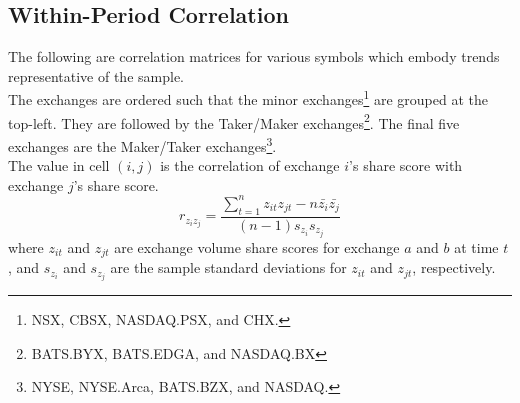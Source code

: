 \documentclass{article}
\begin{document}
\subsection{Within-Period Correlation} \label{withinperiodcorr}
The following are correlation matrices for various symbols which embody trends representative of the sample.\\

The exchanges are ordered such that the minor exchanges\footnote{NSX, CBSX, NASDAQ.PSX, and CHX.} are grouped at the top-left. They are followed by the Taker/Maker exchanges\footnote{BATS.BYX, BATS.EDGA, and NASDAQ.BX}. The final five exchanges are the Maker/Taker exchanges\footnote{NYSE, NYSE.Arca, BATS.BZX, and NASDAQ.}.\\

The value in cell $(i, j)$ is the correlation of exchange $i$'s share score with exchange $j$'s share score.\\
$$r_{z_iz_j} = \frac{\sum_{t=1}^{n} z_{it} z_{jt} - n\bar{z_i}\bar{z_j}}{(n-1)s_{z_i}s_{z_j}}$$
where $z_{it}$ and $z_{jt}$ are exchange volume share scores for exchange $a$ and $b$ at time $t$, and $s_{z_i}$ and $s_{z_j}$ are the sample standard deviations for $z_{it}$ and $z_{jt}$, respectively.
\end{document}
